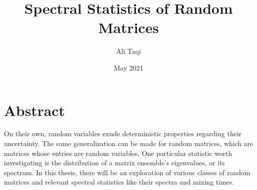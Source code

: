 \documentclass[12pt,twoside]{reedthesis}
\title{Spectral Statistics of Random Matrices}
\author{Ali Taqi}
\date{May 2021}
\begin{document}
  \maketitle
  \frontmatter %
  \pagestyle{empty} %


	
% 
	
    \tableofcontents

    \listoftables


    \chapter*{Abstract}
	On their own, random variables exude deterministic properties regarding their uncertainty. The same generalization can be made for random matrices, which are matrices whose entries are random variables. One particular statistic worth investigating is the distribution of a matrix ensemble's eigenvalues, or its spectrum. In this thesis, there will be an exploration of various classes of random matrices and relevant spectral statistics like their spectra and mixing times.
	
\end{document}
